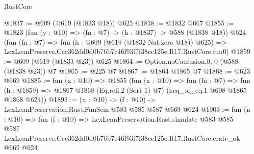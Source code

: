 \begin{lexlean}{RustCore}
\begin{coremodule}
@1837 := @609 (@619 (@1833 @18)) @625
@1838 := @1832 @667
@1855 := @1823
    (fun (y : @10) => (fn : @7) -> (h : @1837) -> @588 (@1838 @18))
    @624
    (fun (fn : @7) =>
    fun (h : @609 (@619 (@1832 Nat.zero @18)) @625) =>
    LexLeanPreserve.Ccc362dd0d0b76b7c46f93f7f38ec125e.R17.RustCore.fun0)
@1859 := @609 (@619 (@1833 @23)) @625
@1864 := Option.noConfusion.{0, 0} (@588 (@1838 @23)) @7
@1865 := @225 @7
@1867 := @1864 @1865 @7
@1868 := @623 @669
@1885 := fun (x : @10) =>
  @1855
    (fun (x : @10) =>
    fun (fn : @7) =>
    fun (h : @1859) => @1867 @1868 (Eq.refl.{2} (Sort 1) @7) (heq_of_eq.{1} @608 @1865 @1868 @624))
@1893 := (n : @10) -> (f : @10) -> LexLeanPreservation.Rust.FunSem @583 @585 @587 @669 @624
@1903 := fun (n : @10) =>
  fun (f : @10) =>
  LexLeanPreservation.Rust.simulate
    @583
    @585
    @587
    LexLeanPreserve.Ccc362dd0d0b76b7c46f93f7f38ec125e.R17.RustCore.crate_ok
    @669
    @624
\end{coremodule}
\end{lexlean}
